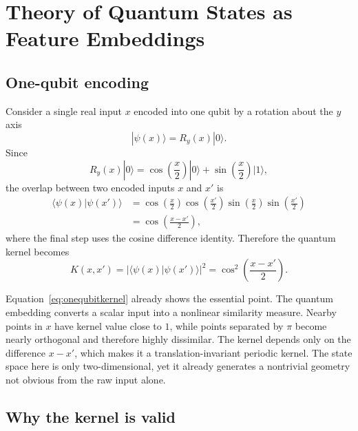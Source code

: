 \documentclass[11pt]{article}
\begin{document}
\section{Theory of Quantum States as Feature Embeddings}

\subsection{One-qubit encoding}

Consider a single real input $x$ encoded into one qubit by a rotation about the $y$ axis
\begin{equation}
|\psi(x)\rangle = R_y(x)|0\rangle.
\label{eq:rymap}
\end{equation}
Since
\begin{equation}
R_y(x)|0\rangle = \cos\left(\frac{x}{2}\right)|0\rangle + \sin\left(\frac{x}{2}\right)|1\rangle,
\label{eq:singlequbitstate}
\end{equation}
the overlap between two encoded inputs $x$ and $x'$ is
\begin{align}
\langle \psi(x)|\psi(x')\rangle
&=
\cos\left(\frac{x}{2}\right)\cos\left(\frac{x'}{2}\right)
\sin\left(\frac{x}{2}\right)\sin\left(\frac{x'}{2}\right) \nonumber \\
&=
\cos\left(\frac{x-x'}{2}\right),
\label{eq:onequbitoverlap}
\end{align}
where the final step uses the cosine difference identity. Therefore the quantum kernel becomes
\begin{equation}
K(x,x') = \left|\langle \psi(x)|\psi(x')\rangle\right|^2
= \cos^2\left(\frac{x-x'}{2}\right).
\label{eq:onequbitkernel}
\end{equation}

Equation~\eqref{eq:onequbitkernel} already shows the essential point. The quantum embedding converts a scalar input into a nonlinear similarity measure. Nearby points in $x$ have kernel value close to $1$, while points separated by $\pi$ become nearly orthogonal and therefore highly dissimilar. The kernel depends only on the difference $x-x'$, which makes it a translation-invariant periodic kernel. The state space here is only two-dimensional, yet it already generates a nontrivial geometry not obvious from the raw input alone.

\subsection{Why the kernel is valid}
\end{document}
